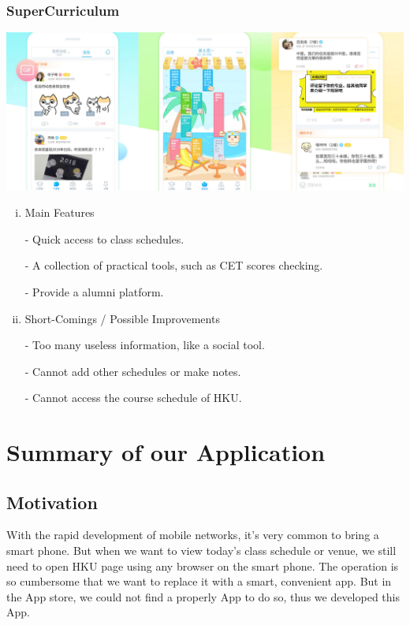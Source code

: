 \documentclass{article}
\begin{document}
    \subsubsection{SuperCurriculum}
    \begin{center}
        \includegraphics[width=6.5in]{SuperCurriculum}
    \end{center}
    \begin{enumerate}[i)]

    \item Main Features

    - Quick access to class schedules.

    - A collection of practical tools, such as CET scores checking.
    
    - Provide a alumni platform.

    \item Short-Comings / Possible Improvements
    
    - Too many useless information, like a social tool.

    - Cannot add other schedules or make notes.

    - Cannot access the course schedule of HKU.

    \end{enumerate}



    \newpage
    \section{Summary of our Application}

    \subsection{Motivation}
    With the rapid development of mobile networks, 
    it’s very common to bring a smart phone. 
    But when we want to view today’s class schedule or venue, 
    we still need to open HKU page using any browser on the smart phone. 
    The operation is so cumbersome that 
    we want to replace it with a smart, convenient app.
    But in the App store, we could not find a properly App
    to do so, thus we developed this App.
\end{document}
